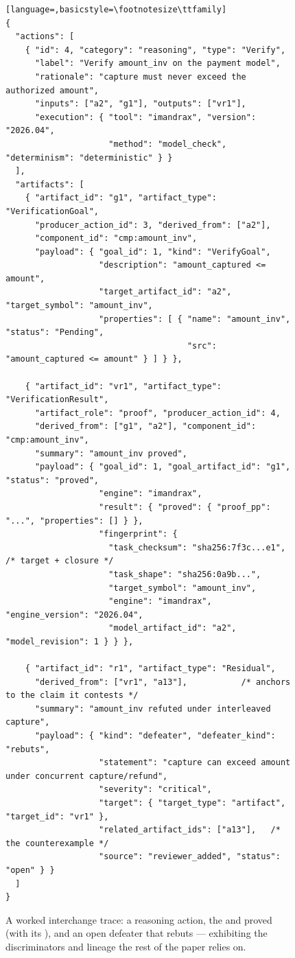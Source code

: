 \begin{figure}[H]
\begin{lstlisting}[language=,basicstyle=\footnotesize\ttfamily]
{
  "actions": [
    { "id": 4, "category": "reasoning", "type": "Verify",
      "label": "Verify amount_inv on the payment model",
      "rationale": "capture must never exceed the authorized amount",
      "inputs": ["a2", "g1"], "outputs": ["vr1"],
      "execution": { "tool": "imandrax", "version": "2026.04",
                     "method": "model_check", "determinism": "deterministic" } }
  ],
  "artifacts": [
    { "artifact_id": "g1", "artifact_type": "VerificationGoal",
      "producer_action_id": 3, "derived_from": ["a2"],
      "component_id": "cmp:amount_inv",
      "payload": { "goal_id": 1, "kind": "VerifyGoal",
                   "description": "amount_captured <= amount",
                   "target_artifact_id": "a2", "target_symbol": "amount_inv",
                   "properties": [ { "name": "amount_inv", "status": "Pending",
                                     "src": "amount_captured <= amount" } ] } },

    { "artifact_id": "vr1", "artifact_type": "VerificationResult",
      "artifact_role": "proof", "producer_action_id": 4,
      "derived_from": ["g1", "a2"], "component_id": "cmp:amount_inv",
      "summary": "amount_inv proved",
      "payload": { "goal_id": 1, "goal_artifact_id": "g1", "status": "proved",
                   "engine": "imandrax",
                   "result": { "proved": { "proof_pp": "...", "properties": [] } },
                   "fingerprint": {
                     "task_checksum": "sha256:7f3c...e1",   /* target + closure */
                     "task_shape": "sha256:0a9b...",
                     "target_symbol": "amount_inv",
                     "engine": "imandrax", "engine_version": "2026.04",
                     "model_artifact_id": "a2", "model_revision": 1 } } },

    { "artifact_id": "r1", "artifact_type": "Residual",
      "derived_from": ["vr1", "a13"],           /* anchors to the claim it contests */
      "summary": "amount_inv refuted under interleaved capture",
      "payload": { "kind": "defeater", "defeater_kind": "rebuts",
                   "statement": "capture can exceed amount under concurrent capture/refund",
                   "severity": "critical",
                   "target": { "target_type": "artifact", "target_id": "vr1" },
                   "related_artifact_ids": ["a13"],   /* the counterexample */
                   "source": "reviewer_added", "status": "open" } }
  ]
}
\end{lstlisting}
\caption{A worked interchange trace: a  reasoning action, the   and proved   (with its ), and an open  defeater  that rebuts  --- exhibiting the discriminators and  lineage the rest of the paper relies on.}
\label{fig:fmt-worked-trace}
\end{figure}

